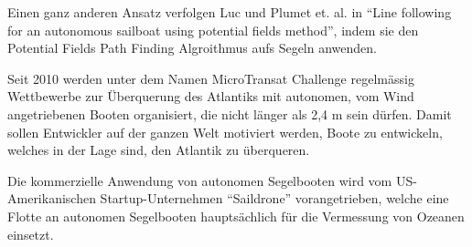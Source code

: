 Einen ganz anderen Ansatz verfolgen Luc und Plumet et. al. in \enquote{Line following for an autonomous sailboat using potential fields method}, indem sie den Potential Fields Path Finding Algroithmus aufs Segeln anwenden. \cite{inproceedings}

Seit 2010 werden unter dem Namen MicroTransat Challenge regelmässig Wettbewerbe zur Überquerung des Atlantiks mit autonomen, vom Wind angetriebenen Booten organisiert, die nicht länger als 2,4 m sein dürfen. 
Damit sollen Entwickler auf der ganzen Welt motiviert werden, Boote zu entwickeln, welches in der Lage sind, den Atlantik zu überqueren. \cite{noauthor_microtransat_nodate}

Die kommerzielle Anwendung von autonomen Segelbooten wird vom US-Amerikanischen 
Startup-Unternehmen \enquote{Saildrone} vorangetrieben, welche eine Flotte an autonomen Segelbooten hauptsächlich für die Vermessung von Ozeanen einsetzt. \cite{noauthor_saildrone_nodate}


























